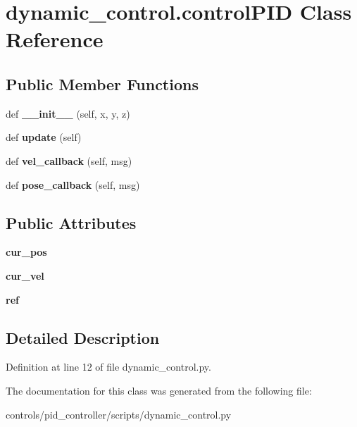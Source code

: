 \hypertarget{classdynamic__control_1_1controlPID}{}\section{dynamic\+\_\+control.\+control\+P\+ID Class Reference}
\label{classdynamic__control_1_1controlPID}
\subsection*{Public Member Functions}
\begin{DoxyCompactItemize}
\item 
\mbox{\label{classdynamic__control_1_1controlPID_a0b8d25b76380d973d0d7147fd09f672a}} 
def {\bfseries \+\_\+\+\_\+init\+\_\+\+\_\+} (self, x, y, z)
\item 
\mbox{\label{classdynamic__control_1_1controlPID_a6cca6df65d595ceb98b416a48428d17b}} 
def {\bfseries update} (self)
\item 
\mbox{\label{classdynamic__control_1_1controlPID_a5ae1679965b0a97dc4cac6551a73bc07}} 
def {\bfseries vel\+\_\+callback} (self, msg)
\item 
\mbox{\label{classdynamic__control_1_1controlPID_aac2ff520a1820ce54678b55376ed1f22}} 
def {\bfseries pose\+\_\+callback} (self, msg)
\end{DoxyCompactItemize}
\subsection*{Public Attributes}
\begin{DoxyCompactItemize}
\item 
\mbox{\label{classdynamic__control_1_1controlPID_a4afc4e489d19e2eeb92c7afb72056a7a}} 
{\bfseries cur\+\_\+pos}
\item 
\mbox{\label{classdynamic__control_1_1controlPID_a063126c84be15beefb15fafbf5ebf28e}} 
{\bfseries cur\+\_\+vel}
\item 
\mbox{\label{classdynamic__control_1_1controlPID_a264c445867b38668ca57ef0213b916f4}} 
{\bfseries ref}
\end{DoxyCompactItemize}


\subsection{Detailed Description}


Definition at line 12 of file dynamic\+\_\+control.\+py.



The documentation for this class was generated from the following file\+:\begin{DoxyCompactItemize}
\item 
controls/pid\+\_\+controller/scripts/dynamic\+\_\+control.\+py\end{DoxyCompactItemize}
